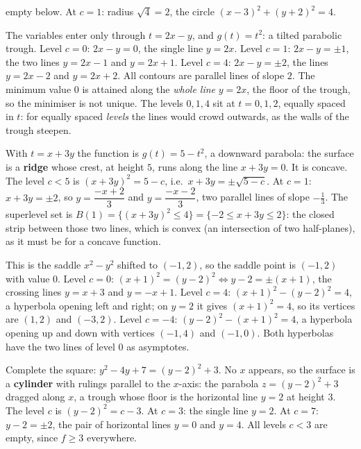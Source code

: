 \begin{solutions}
        empty below. At $c=1$: radius $\sqrt4=2$, the circle
        $(x-3)^{2}+(y+2)^{2}=4$.
  \item The variables enter only through $t=2x-y$, and $g(t)=t^{2}$: a
        tilted parabolic trough. Level $c=0$: $2x-y=0$, the single line
        $y=2x$. Level $c=1$: $2x-y=\pm1$, the two lines $y=2x-1$ and
        $y=2x+1$. Level $c=4$: $2x-y=\pm2$, the lines $y=2x-2$ and
        $y=2x+2$. All contours are parallel lines of slope $2$. The minimum
        value $0$ is attained along the \emph{whole line} $y=2x$, the floor
        of the trough, so the minimiser is not unique. The levels $0,1,4$
        sit at $t=0,1,2$, equally spaced in $t$: for equally spaced
        \emph{levels} the lines would crowd outwards, as the walls of the
        trough steepen.
  \item With $t=x+3y$ the function is $g(t)=5-t^{2}$, a downward parabola:
        the surface is a \textbf{ridge} whose crest, at height $5$, runs
        along the line $x+3y=0$. It is concave. The level $c<5$ is
        $(x+3y)^{2}=5-c$, i.e.\ $x+3y=\pm\sqrt{5-c}$. At $c=1$:
        $x+3y=\pm2$, so $y=\dfrac{-x+2}{3}$ and $y=\dfrac{-x-2}{3}$, two
        parallel lines of slope $-\tfrac13$. The superlevel set is
        $B(1)=\{(x+3y)^{2}\le4\}=\{-2\le x+3y\le2\}$: the closed strip
        between those two lines, which is convex (an intersection of two
        half-planes), as it must be for a concave function.
  \item This is the saddle $x^{2}-y^{2}$ shifted to $(-1,2)$, so the saddle
        point is $(-1,2)$ with value $0$. Level $c=0$:
        $(x+1)^{2}=(y-2)^{2}\iff y-2=\pm(x+1)$, the crossing lines
        $y=x+3$ and $y=-x+1$. Level $c=4$:
        $(x+1)^{2}-(y-2)^{2}=4$, a hyperbola opening left and right; on
        $y=2$ it gives $(x+1)^{2}=4$, so its vertices are $(1,2)$ and
        $(-3,2)$. Level $c=-4$: $(y-2)^{2}-(x+1)^{2}=4$, a hyperbola
        opening up and down with vertices $(-1,4)$ and $(-1,0)$. Both
        hyperbolas have the two lines of level $0$ as asymptotes.
  \item Complete the square: $y^{2}-4y+7=(y-2)^{2}+3$. No $x$ appears, so
        the surface is a \textbf{cylinder} with rulings parallel to the
        $x$-axis: the parabola $z=(y-2)^{2}+3$ dragged along $x$, a trough
        whose floor is the horizontal line $y=2$ at height $3$. The level
        $c$ is $(y-2)^{2}=c-3$. At $c=3$: the single line $y=2$. At $c=7$:
        $y-2=\pm2$, the pair of horizontal lines $y=0$ and $y=4$. All
        levels $c<3$ are empty, since $f\ge3$ everywhere.

\end{solutions}
